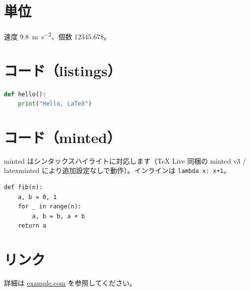 \documentclass[lualatex,paper=a4,fontsize=10.5pt]{jlreq}
\begin{document}
\section{単位}
速度 \qty{9.8}{\meter\per\second\squared}、個数 \num{12345.678}。

\section{コード（listings）}
\begin{lstlisting}[language=Python]
def hello():
    print("Hello, LaTeX")
\end{lstlisting}

\section{コード（minted）}
minted はシンタックスハイライトに対応します（TeX Live 同梱の minted v3 /
latexminted により追加設定なしで動作）。インラインは \texttt{lambda x: x+1}。
\begin{verbatim}
def fib(n):
    a, b = 0, 1
    for _ in range(n):
        a, b = b, a + b
    return a
\end{verbatim}

\section{リンク}
詳細は \href{https://example.com}{example.com} を参照してください。
\end{document}
